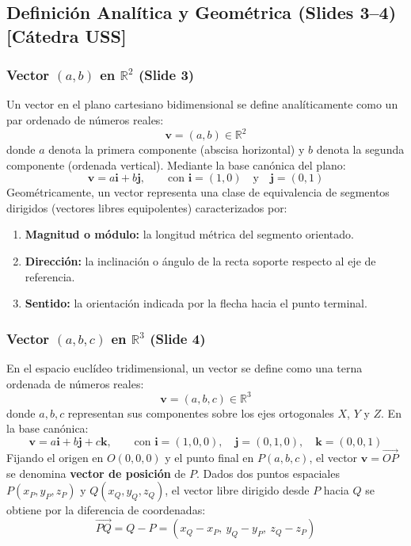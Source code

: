 \documentclass[10pt,letterpaper]{article}
\newcommand{\iu}{\mathbf{i}}
\newcommand{\ju}{\mathbf{j}}
\newcommand{\ku}{\mathbf{k}}
\newcommand{\vv}{\mathbf{v}}
\begin{document}
\subsection{Definición Analítica y Geométrica (Slides 3--4) [Cátedra USS]}

\subsubsection{\texorpdfstring{Vector $(a,b)$ en $\mathbb{R}^2$ (Slide 3)}{Vector (a,b) en R2 (Slide 3)}}
Un vector en el plano cartesiano bidimensional se define analíticamente como un par ordenado de números reales:
\[
\vv = (a, b) \in \mathbb{R}^2
\]
donde $a$ denota la primera componente (abscisa horizontal) y $b$ denota la segunda componente (ordenada vertical). Mediante la base canónica del plano:
\[
\vv = a\iu + b\ju, \qquad \text{con } \iu = (1, 0) \quad \text{y} \quad \ju = (0, 1)
\]
Geométricamente, un vector representa una clase de equivalencia de segmentos dirigidos (vectores libres equipolentes) caracterizados por:
\begin{enumerate}
    \item \textbf{Magnitud o módulo:} la longitud métrica del segmento orientado.
    \item \textbf{Dirección:} la inclinación o ángulo de la recta soporte respecto al eje de referencia.
    \item \textbf{Sentido:} la orientación indicada por la flecha hacia el punto terminal.
\end{enumerate}

\subsubsection{\texorpdfstring{Vector $(a,b,c)$ en $\mathbb{R}^3$ (Slide 4)}{Vector (a,b,c) en R3 (Slide 4)}}
En el espacio euclídeo tridimensional, un vector se define como una terna ordenada de números reales:
\[
\vv = (a, b, c) \in \mathbb{R}^3
\]
donde $a, b, c$ representan sus componentes sobre los ejes ortogonales $X$, $Y$ y $Z$. En la base canónica:
\[
\vv = a\iu + b\ju + c\ku, \qquad \text{con } \iu = (1, 0, 0), \quad \ju = (0, 1, 0), \quad \ku = (0, 0, 1)
\]
Fijando el origen en $O(0,0,0)$ y el punto final en $P(a,b,c)$, el vector $\vv = \overrightarrow{OP}$ se denomina \textbf{vector de posición} de $P$. Dados dos puntos espaciales $P(x_P, y_P, z_P)$ y $Q(x_Q, y_Q, z_Q)$, el vector libre dirigido desde $P$ hacia $Q$ se obtiene por la diferencia de coordenadas:
\[
\overrightarrow{PQ} = Q - P = (x_Q - x_P,\ y_Q - y_P,\ z_Q - z_P)
\]
\end{document}
